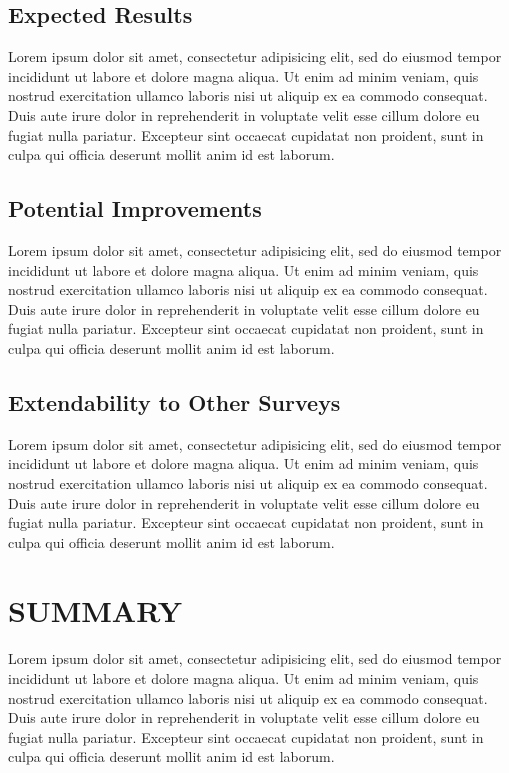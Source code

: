 \documentclass[apj, revtex4]{emulateapj}
\begin{document}
\subsection{Expected Results}
Lorem ipsum dolor sit amet, consectetur adipisicing elit, sed do eiusmod tempor incididunt ut labore et dolore magna aliqua. Ut enim ad minim veniam, quis nostrud exercitation ullamco laboris nisi ut aliquip ex ea commodo consequat. Duis aute irure dolor in reprehenderit in voluptate velit esse cillum dolore eu fugiat nulla pariatur. Excepteur sint occaecat cupidatat non proident, sunt in culpa qui officia deserunt mollit anim id est laborum.

\subsection{Potential Improvements}
Lorem ipsum dolor sit amet, consectetur adipisicing elit, sed do eiusmod tempor incididunt ut labore et dolore magna aliqua. Ut enim ad minim veniam, quis nostrud exercitation ullamco laboris nisi ut aliquip ex ea commodo consequat. Duis aute irure dolor in reprehenderit in voluptate velit esse cillum dolore eu fugiat nulla pariatur. Excepteur sint occaecat cupidatat non proident, sunt in culpa qui officia deserunt mollit anim id est laborum.

\subsection{Extendability to Other Surveys}
Lorem ipsum dolor sit amet, consectetur adipisicing elit, sed do eiusmod tempor incididunt ut labore et dolore magna aliqua. Ut enim ad minim veniam, quis nostrud exercitation ullamco laboris nisi ut aliquip ex ea commodo consequat. Duis aute irure dolor in reprehenderit in voluptate velit esse cillum dolore eu fugiat nulla pariatur. Excepteur sint occaecat cupidatat non proident, sunt in culpa qui officia deserunt mollit anim id est laborum.

\section{SUMMARY}
Lorem ipsum dolor sit amet, consectetur adipisicing elit, sed do eiusmod tempor incididunt ut labore et dolore magna aliqua. Ut enim ad minim veniam, quis nostrud exercitation ullamco laboris nisi ut aliquip ex ea commodo consequat. Duis aute irure dolor in reprehenderit in voluptate velit esse cillum dolore eu fugiat nulla pariatur. Excepteur sint occaecat cupidatat non proident, sunt in culpa qui officia deserunt mollit anim id est laborum.
\end{document}
